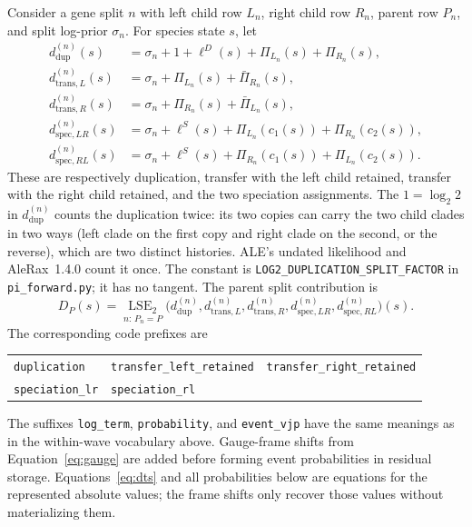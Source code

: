 \documentclass[11pt]{article}
\begin{document}
Consider a gene split $n$ with left child row $L_n$, right child row $R_n$,
parent row $P_n$, and split log-prior $\sigma_n$.  For species state $s$, let
\begin{align}
  d_{\mathrm{dup}}^{(n)}(s)&=\sigma_n+1+\ell^D(s)+\Pi_{L_n}(s)+\Pi_{R_n}(s), \\
  d_{\mathrm{trans},L}^{(n)}(s)&=\sigma_n+\Pi_{L_n}(s)+\bar\Pi_{R_n}(s), \\
  d_{\mathrm{trans},R}^{(n)}(s)&=\sigma_n+\Pi_{R_n}(s)+\bar\Pi_{L_n}(s), \\
  d_{\mathrm{spec},LR}^{(n)}(s)&=\sigma_n+\ell^S(s)
    +\Pi_{L_n}(c_1(s))+\Pi_{R_n}(c_2(s)), \\
  d_{\mathrm{spec},RL}^{(n)}(s)&=\sigma_n+\ell^S(s)
    +\Pi_{R_n}(c_1(s))+\Pi_{L_n}(c_2(s)).
\end{align}
These are respectively duplication, transfer with the left child retained,
transfer with the right child retained, and the two speciation assignments.
The $1=\log_2 2$ in $d_{\mathrm{dup}}^{(n)}$ counts the duplication twice: its two
copies can carry the two child clades in two ways (left clade on the first copy
and right clade on the second, or the reverse), which are two distinct
histories.  ALE's undated likelihood and AleRax~1.4.0 count it once.  The
constant is \texttt{LOG2\_DUPLICATION\_SPLIT\_FACTOR} in \texttt{pi\_forward.py}; it has
no tangent.
The parent split contribution is
\begin{equation}
  D_P(s)=\underset{n:\,P_n=P}{\operatorname{LSE}_2}
  \bigl(
    d_{\mathrm{dup}}^{(n)},d_{\mathrm{trans},L}^{(n)},
    d_{\mathrm{trans},R}^{(n)},d_{\mathrm{spec},LR}^{(n)},
    d_{\mathrm{spec},RL}^{(n)}
  \bigr)(s).
  \label{eq:dts}
\end{equation}
The corresponding code prefixes are
\begin{center}
\begin{tabular}{lll}
\texttt{duplication} & \texttt{transfer\_left\_retained} & \texttt{transfer\_right\_retained} \\
\texttt{speciation\_lr} & \texttt{speciation\_rl} &
\end{tabular}
\end{center}
The suffixes \texttt{log\_term},
\texttt{probability}, and \texttt{event\_vjp} have the same meanings as in
the within-wave vocabulary above.
Gauge-frame shifts from Equation~\eqref{eq:gauge} are added before forming
event probabilities in residual storage.  Equations~\eqref{eq:dts} and all
probabilities below are equations for the represented absolute values; the
frame shifts only recover those values without materializing them.
\end{document}
